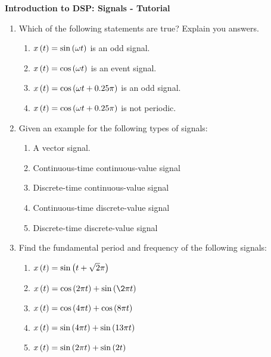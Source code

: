 \documentclass[12pt]{article}
\def\lp{\ensuremath\left(}
\def\rp{\ensuremath\right)}
\begin{document}
\begin{center}
    \begin{Large}
        \textbf{Introduction to DSP: Signals - Tutorial}
    \end{Large}
\end{center}
\vspace{0.2cm}

\begin{enumerate}
    \item Which of the following statements are true? Explain you answers.
    \begin{enumerate}
        \item $x\lp t \rp = \sin\lp \omega t\rp$ is an odd signal. \vspace{3cm}
        \item $x\lp t \rp = \cos\lp \omega t\rp$ is an event signal. \vspace{3cm}
        \item $x\lp t \rp = \cos\lp \omega t + 0.25\pi\rp$ is an odd signal. \vspace{3cm}
        \item $x\lp t \rp = \cos\lp \omega t + 0.25\pi\rp$ is not periodic. \vspace{3cm}
    \end{enumerate}
    \newpage

    \item Given an example for the following types of signals:
    \begin{enumerate}
        \item A vector signal.
        \item Continuous-time continuous-value signal
        \item Discrete-time continuous-value signal
        \item Continuous-time discrete-value signal
        \item Discrete-time discrete-value signal
    \end{enumerate}
    \newpage

    \item Find the fundamental period and frequency of the following signals:
    \begin{enumerate}
        \item $x\lp t \rp = \sin\lp t + \sqrt{2}\pi\rp$ \vspace{3cm}
        \item $x\lp t \rp = \cos\lp 2\pi t\rp + \sin\lp \2\pi t\rp$ \vspace{3cm}
        \item $x\lp t \rp = \cos\lp 4\pi t\rp + \cos\lp 8\pi t\rp$ \vspace{3cm}
        \item $x\lp t \rp = \sin\lp 4\pi t\rp + \sin\lp 13\pi t\rp$ \vspace{3cm}
        \item $x\lp t \rp = \sin\lp 2\pi t\rp + \sin\lp 2t \rp$ \vspace{3cm}
    \end{enumerate}
    \newpage


\end{enumerate}
\end{document}

